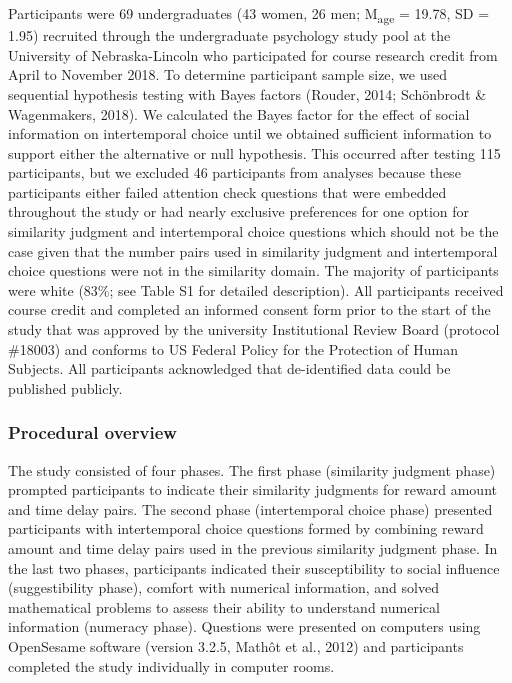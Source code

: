 \documentclass[
  pub,floatsintext]{apa6}
\begin{document}
Participants were 69 undergraduates (43 women, 26 men; M\textsubscript{age} = 19.78, SD = 1.95) recruited through the undergraduate psychology study pool at the University of Nebraska-Lincoln who participated for course research credit from April to November 2018. To determine participant sample size, we used sequential hypothesis testing with Bayes factors (Rouder, 2014; Schönbrodt \& Wagenmakers, 2018). We calculated the Bayes factor for the effect of social information on intertemporal choice until we obtained sufficient information to support either the alternative or null hypothesis. This occurred after testing 115 participants, but we excluded 46 participants from analyses because these participants either failed attention check questions that were embedded throughout the study or had nearly exclusive preferences for one option for similarity judgment and intertemporal choice questions which should not be the case given that the number pairs used in similarity judgment and intertemporal choice questions were not in the similarity domain. The majority of participants were white (83\%; see Table S1 for detailed description). All participants received course credit and completed an informed consent form prior to the start of the study that was approved by the university Institutional Review Board (protocol \#18003) and conforms to US Federal Policy for the Protection of Human Subjects. All participants acknowledged that de-identified data could be published publicly.

\hypertarget{procedural-overview}{%
\subsubsection{Procedural overview}\label{procedural-overview}}

The study consisted of four phases. The first phase (similarity judgment phase) prompted participants to indicate their similarity judgments for reward amount and time delay pairs. The second phase (intertemporal choice phase) presented participants with intertemporal choice questions formed by combining reward amount and time delay pairs used in the previous similarity judgment phase. In the last two phases, participants indicated their susceptibility to social influence (suggestibility phase), comfort with numerical information, and solved mathematical problems to assess their ability to understand numerical information (numeracy phase). Questions were presented on computers using OpenSesame software (version 3.2.5, Mathôt et al., 2012) and participants completed the study individually in computer rooms.
\end{document}
